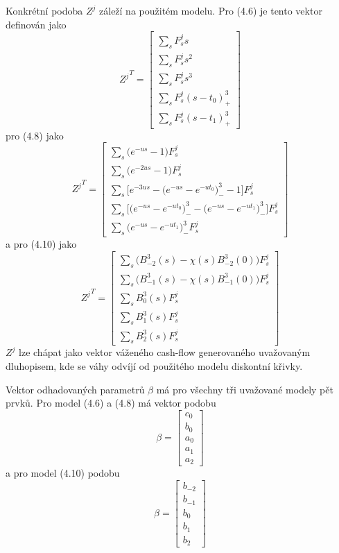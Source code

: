 \documentclass[a4paper]{book}
\begin{document}
Konkrétní podoba $Z^j$ záleží na použitém modelu. Pro (4.6) je tento vektor definován jako
\begin{equation*}
{Z^j}^T =
\begin{bmatrix}
\sum_s F_s^j s \\
\sum_s F_s^j s^2 \\
\sum_s F_s^j s^3 \\
\sum_s F_s^j (s - t_0)_{+}^3 \\
\sum_s F_s^j (s - t_1)_{+}^3
\end{bmatrix}
\end{equation*}
pro (4.8) jako
\begin{equation*}
{Z^j}^T =
\begin{bmatrix}
\sum_s \Big( e^{-us} - 1 \Big)F_s^j \\
\sum_s \Big( e^{-2us} - 1 \Big) F_s^j \\
\sum_s \Big[e^{-3us} - \Big(e^{-us} - e^{-ut_0} \Big)_{-}^3 - 1 \Big] F_s^j \\
\sum_s \Big[ \Big(e^{-us} - e^{-ut_0} \Big)_{-}^3 - \Big(e^{-us} - e^{-ut_1} \Big)_{-}^3\Big] F_s^j \\
\sum_s \Big(e^{-us} - e^{-ut_1} \Big)_{-}^3 F_s^j
\end{bmatrix}
\end{equation*}
a pro (4.10) jako
\begin{equation*}
{Z^j}^T =
\begin{bmatrix}
\sum_s \Big( B_{-2}^3(s) - \chi(s)B_{-2}^3(0) \Big)F_s^j \\
\sum_s \Big( B_{-1}^3(s) - \chi(s)B_{-1}^3(0) \Big)F_s^j \\
\sum_s B_{0}^3(s)F_s^j \\
\sum_s B_{1}^3(s)F_s^j \\
\sum_s B_{2}^3(s)F_s^j
\end{bmatrix}
\end{equation*}
$Z^j$ lze chápat jako vektor váženého cash-flow generovaného uvažovaným dluhopisem, kde se váhy odvíjí od použitého modelu diskontní křivky.

Vektor odhadovaných parametrů $\beta$ má pro všechny tři uvažované modely pět prvků. Pro model (4.6) a (4.8) má vektor podobu
\begin{equation*}
\beta =
\begin{bmatrix}
c_0\\
b_0\\
a_0\\
a_1\\
a_2
\end{bmatrix}
\end{equation*}
a pro model (4.10) podobu
\begin{equation*}
\beta =
\begin{bmatrix}
b_{-2}\\
b_{-1}\\
b_0\\
b_1\\
b_2
\end{bmatrix}
\end{equation*}
\end{document}
